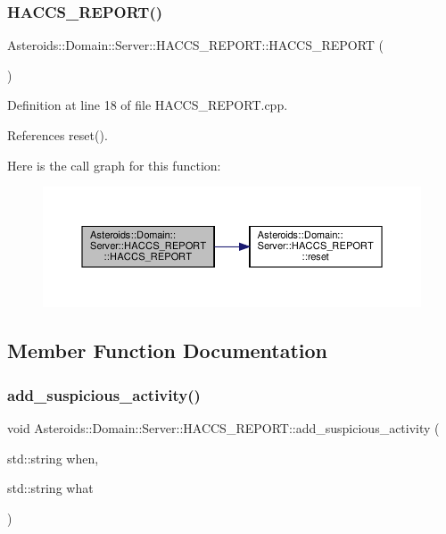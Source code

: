 \subsubsection{\texorpdfstring{H\+A\+C\+C\+S\+\_\+\+R\+E\+P\+O\+R\+T()}{HACCS\_REPORT()}}
{\footnotesize\ttfamily Asteroids\+::\+Domain\+::\+Server\+::\+H\+A\+C\+C\+S\+\_\+\+R\+E\+P\+O\+R\+T\+::\+H\+A\+C\+C\+S\+\_\+\+R\+E\+P\+O\+RT (\begin{DoxyParamCaption}{ }\end{DoxyParamCaption})}



Definition at line 18 of file H\+A\+C\+C\+S\+\_\+\+R\+E\+P\+O\+R\+T.\+cpp.



References reset().

Here is the call graph for this function\+:\nopagebreak
\begin{figure}[H]
\begin{center}
\leavevmode
\includegraphics[width=350pt]{classAsteroids_1_1Domain_1_1Server_1_1HACCS__REPORT_a23cfcd0e92df6dd9c5f6b3ddbf3af55f_cgraph}
\end{center}
\end{figure}


\subsection{Member Function Documentation}
\mbox{\label{classAsteroids_1_1Domain_1_1Server_1_1HACCS__REPORT_ad05d48af0fc073b5b4f1889044d0ab53}} 
\subsubsection{\texorpdfstring{add\+\_\+suspicious\+\_\+activity()}{add\_suspicious\_activity()}}
{\footnotesize\ttfamily void Asteroids\+::\+Domain\+::\+Server\+::\+H\+A\+C\+C\+S\+\_\+\+R\+E\+P\+O\+R\+T\+::add\+\_\+suspicious\+\_\+activity (\begin{DoxyParamCaption}\item[{std\+::string}]{when,  }\item[{std\+::string}]{what }\end{DoxyParamCaption})\hspace{0.3cm}{\ttfamily [virtual]}}

